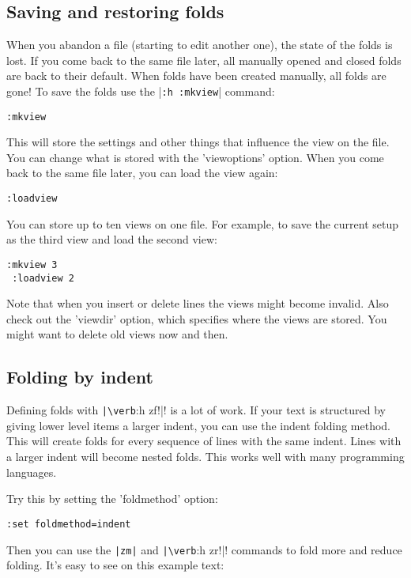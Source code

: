 \subsection{Saving and restoring folds}
When you abandon a file (starting to edit another one), the state of the folds is lost.
If you come back to the same file later, all manually opened and closed folds are back to their default.
When folds have been created manually, all folds are gone!  To save the folds use the |\verb!:h :mkview!| command:

\begin{Verbatim}[samepage=true]
 :mkview
\end{Verbatim}

This will store the settings and other things that influence the view on the file.
You can change what is stored with the 'viewoptions' option.
When you come back to the same file later, you can load the view again:

\begin{Verbatim}[samepage=true]
 :loadview
\end{Verbatim}

You can store up to ten views on one file.
For example, to save the current setup as the third view and load the second view:

\begin{Verbatim}[samepage=true]
 :mkview 3
 :loadview 2
\end{Verbatim}

Note that when you insert or delete lines the views might become invalid.
Also check out the 'viewdir' option, which specifies where the views are stored.
You might want to delete old views now and then.
\subsection{Folding by indent}
Defining folds with \verb!|\verb!:h zf!|! is a lot of work.
If your text is structured by giving lower level items a larger indent, you can use the indent folding method.
This will create folds for every sequence of lines with the same indent.
Lines with a larger indent will become nested folds.
This works well with many programming languages.

Try this by setting the 'foldmethod' option:

\begin{Verbatim}[samepage=true]
 :set foldmethod=indent
\end{Verbatim}

Then you can use the \verb!|zm|! and \verb!|\verb!:h zr!|! commands to fold more and reduce folding.
It's easy to see on this example text:

